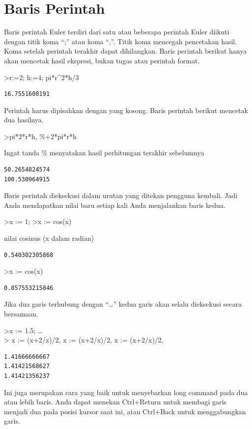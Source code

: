 \documentclass[
]{book}
\begin{document}
\section{Baris Perintah}\label{baris-perintah}

Baris perintah Euler terdiri dari satu atau beberapa perintah Euler diikuti dengan titik koma ``;'' atau koma ``,''. Titik koma mencegah pencetakan hasil. Koma setelah perintah terakhir dapat dihilangkan. Baris perintah berikut hanya akan mencetak hasil ekspresi, bukan tugas atau perintah format.

\textgreater r:=2; h:=4; pi*r\^{}2*h/3

\begin{verbatim}
16.7551608191
\end{verbatim}

Perintah harus dipisahkan dengan yang kosong. Baris perintah berikut mencetak dua hasilnya.

\textgreater pi*2*r*h, \%+2*pi*r*h

Ingat tanda \% menyatakan hasil perhitungan terakhir sebelumnya

\begin{verbatim}
50.2654824574
100.530964915
\end{verbatim}

Baris perintah dieksekusi dalam urutan yang ditekan pengguna kembali. Jadi Anda mendapatkan nilai baru setiap kali Anda menjalankan baris kedua.

\textgreater x := 1; \textgreater x := cos(x)

nilai cosinus (x dalam radian)

\begin{verbatim}
0.540302305868
\end{verbatim}

\textgreater x := cos(x)

\begin{verbatim}
0.857553215846
\end{verbatim}

Jika dua garis terhubung dengan ``\ldots{}'' kedua garis akan selalu dieksekusi secara bersamaan.

\textgreater x := 1.5; \ldots{}\\
\textgreater{} x := (x+2/x)/2, x := (x+2/x)/2, x := (x+2/x)/2,

\begin{verbatim}
1.41666666667
1.41421568627
1.41421356237
\end{verbatim}

Ini juga merupakan cara yang baik untuk menyebarkan long command pada dua atau lebih baris. Anda dapat menekan Ctrl+Return untuk membagi garis menjadi dua pada posisi kursor saat ini, atau Ctrl+Back untuk menggabungkan garis.
\end{document}
